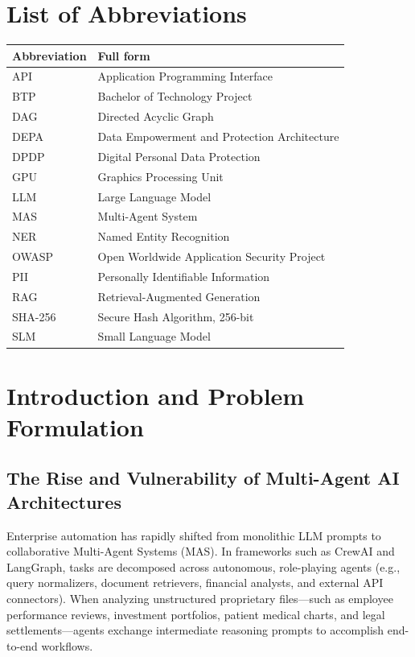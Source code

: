 \documentclass[11pt,a4paper]{article}
\begin{document}
\section*{List of Abbreviations}
\begin{tabularx}{\textwidth}{l X}
\toprule
\textbf{Abbreviation} & \textbf{Full form} \\
\midrule
API & Application Programming Interface \\
BTP & Bachelor of Technology Project \\
DAG & Directed Acyclic Graph \\
DEPA & Data Empowerment and Protection Architecture \\
DPDP & Digital Personal Data Protection \\
GPU & Graphics Processing Unit \\
LLM & Large Language Model \\
MAS & Multi-Agent System \\
NER & Named Entity Recognition \\
OWASP & Open Worldwide Application Security Project \\
PII & Personally Identifiable Information \\
RAG & Retrieval-Augmented Generation \\
SHA-256 & Secure Hash Algorithm, 256-bit \\
SLM & Small Language Model \\
\bottomrule
\end{tabularx}

\clearpage
{}

\section{Introduction and Problem Formulation}

\subsection{The Rise and Vulnerability of Multi-Agent AI Architectures}
Enterprise automation has rapidly shifted from monolithic LLM prompts to collaborative Multi-Agent Systems (MAS). In frameworks such as CrewAI \cite{crewai2024} and LangGraph, tasks are decomposed across autonomous, role-playing agents (e.g., query normalizers, document retrievers, financial analysts, and external API connectors). When analyzing unstructured proprietary files---such as employee performance reviews, investment portfolios, patient medical charts, and legal settlements---agents exchange intermediate reasoning prompts to accomplish end-to-end workflows.
\end{document}
